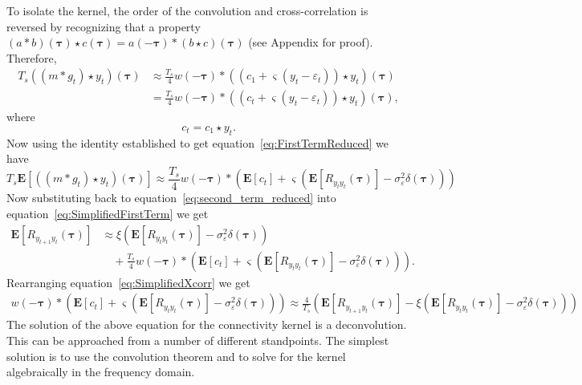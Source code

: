 \documentclass[conference,onecolumn]{IEEEtran}
\begin{document}
To isolate the kernel, the order of the convolution and cross-correlation is reversed by recognizing that a property $(a \ast b)(\boldsymbol\tau) \star c(\boldsymbol\tau) = a(-\boldsymbol\tau)\ast(b \star c)(\boldsymbol\tau)$ (see Appendix for proof). Therefore,
\begin{align}
	T_s((m \ast g_t) \star y_t)(\boldsymbol\tau) &\approx \frac{T_s}{4} w(-\boldsymbol\tau) \ast ((c_1 + \varsigma (y_t - \varepsilon_t)) \star y_t)(\boldsymbol\tau)\\
	&= \frac{T_s}{4}w(-\boldsymbol\tau) \ast (( c_t + \varsigma (y_t - \varepsilon_t)) \star y_t) (\boldsymbol\tau),
\end{align}
where
\begin{equation}
	c_t = c_1\star y_t.
\end{equation}
Now using the identity established to get equation~\ref{eq:FirstTermReduced} we have
\begin{equation}\label{eq:second_term_reduced}
	T_s\mathbf{E}\left[((m \ast g_t) \star y_t)(\boldsymbol\tau)\right] \approx \frac{T_s}{4} w(-\boldsymbol\tau) \ast (\mathbf{E}\left[c_t\right] + \varsigma (\mathbf{E}\left[R_{y_ty_t}(\boldsymbol\tau)\right] - \sigma_{\varepsilon}^2 \delta(\boldsymbol\tau)))
\end{equation}
Now substituting back to equation~\ref{eq:second_term_reduced} into equation~\ref{eq:SimplifiedFirstTerm} we get
\begin{align}\label{eq:SimplifiedXcorr}
	\mathbf{E}[R_{y_{t+1}y_t}(\boldsymbol{\tau})] &\approx \xi\left(\mathbf{E}[ R_{y_ty_t}(\boldsymbol{\tau})] - \sigma_{\varepsilon}^2 \delta(\boldsymbol{\tau})\right) \nonumber \\
	&\quad+ \frac{T_s}{4} w(-\boldsymbol\tau) \ast (\mathbf{E}\left[c_t\right] + \varsigma (\mathbf{E}\left[R_{y_ty_t}(\boldsymbol\tau)\right] - \sigma_{\varepsilon}^2 \delta(\boldsymbol\tau))).
\end{align}
Rearranging equation~\ref{eq:SimplifiedXcorr} we get
\begin{align}
	w(-\boldsymbol\tau) \ast (\mathbf{E}\left[c_t\right] + \varsigma (\mathbf{E}\left[R_{y_ty_t}(\boldsymbol\tau)\right] - \sigma_{\varepsilon}^2 \delta(\boldsymbol\tau))) \approx \frac{4}{T_s}(\mathbf{E}[R_{y_{t+1}y_t}(\boldsymbol{\tau})] - \xi\left(\mathbf{E}[ R_{y_ty_t}(\boldsymbol{\tau})] - \sigma_{\varepsilon}^2 \delta(\boldsymbol{\tau})\right))
\end{align}
The solution of the above equation for the connectivity kernel is a deconvolution. This can be approached from a number of different standpoints. The simplest solution is to use the convolution theorem and to solve for the kernel algebraically in the frequency domain. %
\end{document}
